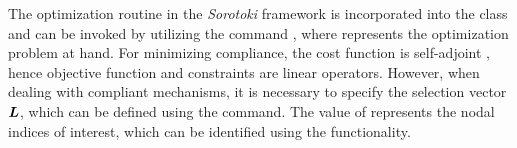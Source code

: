 The optimization routine in the \textit{Sorotoki} framework is incorporated into the  class and can be invoked by utilizing the command , where  represents the optimization problem at hand. For minimizing compliance, the cost function is self-adjoint \cite{Bendsoe2003}, hence objective function and constraints are linear operators. However, when dealing with compliant mechanisms, it is necessary to specify the selection vector ${\boldsymbol{L}}$, which can be defined using the  command. The value of  represents the nodal indices of interest, which can be identified using the  functionality.


